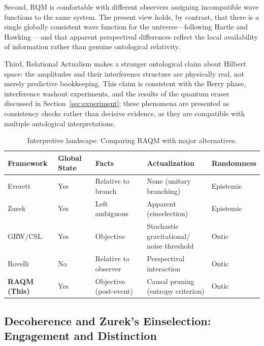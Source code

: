 \documentclass[11pt,a4paper]{article}
\theoremstyle{plain}
\theoremstyle{definition}
\theoremstyle{remark}
\begin{document}
Second, RQM is comfortable with different observers assigning incompatible wave
functions to the same system. The present view holds, by contrast, that there is a
single globally consistent wave function for the universe---following Hartle and
Hawking \citep{HartleHawking1983}---and that apparent perspectival differences
reflect the local availability of information rather than genuine ontological
relativity.

Third, Relational Actualism makes a stronger ontological claim about Hilbert
space: the amplitudes and their interference structure are physically real, not
merely predictive bookkeeping. This claim is consistent with the Berry phase,
interference washout experiments, and the results of the quantum eraser discussed
in Section~\ref{sec:experiment}; these phenomena are presented as consistency
checks rather than decisive evidence, as they are compatible with multiple
ontological interpretations.

\begin{table}[ht]
\centering
\caption{Interpretive landscape: Comparing RAQM with major alternatives.}
\label{tab:landscape}
\small
\begin{tabular}{lllll}
\toprule
\textbf{Framework} & \textbf{Global State} & \textbf{Facts} &
\textbf{Actualization} & \textbf{Randomness}\\
\midrule
Everett \citep{Everett1957}
  & Yes & Relative to branch & None (unitary branching) & Epistemic\\[2pt]
Zurek \citep{Zurek2003}
  & Yes & Left ambiguous & Apparent (einselection) & Epistemic\\[2pt]
GRW/CSL \citep{Bassi2013}
  & Yes & Objective
  & \parbox[t]{3cm}{Stochastic gravitational/\\noise threshold} & Ontic\\[6pt]
Rovelli \citep{Rovelli1996}
  & No & Relative to observer & Perspectival interaction & Ontic\\[2pt]
\textbf{RAQM (This)}
  & Yes & Objective (post-event)
  & \parbox[t]{3cm}{Causal pruning\\(entropy criterion)} & Ontic\\
\bottomrule
\end{tabular}
\end{table}

\subsection{Decoherence and Zurek's Einselection: Engagement and Distinction}
\end{document}
